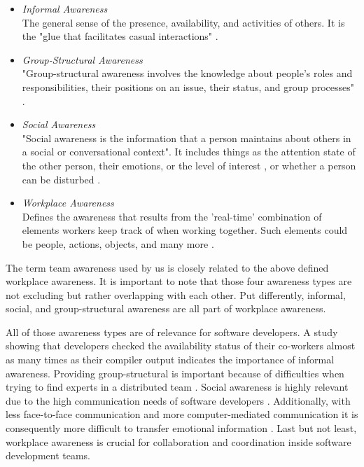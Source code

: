 \begin{itemize}
    \item \textit{Informal Awareness} \\
    The general sense of the presence, availability, and activities of others. It is the "glue that facilitates casual interactions" \cite{gutwin1996workspace}. 
    \item \textit{Group-Structural Awareness} \\
    "Group-structural awareness involves the knowledge about people’s
    roles and responsibilities, their positions on an issue, their status, and group processes" \cite{gutwin1996workspace}.
    \item \textit{Social Awareness} \\
    "Social awareness is the information that a person maintains about others in a social or conversational context"\cite{gutwin1996workspace}. It includes things as the attention state of the other person, their emotions, or the level of interest \cite{gutwin1996workspace}, or whether a person can be disturbed \cite{gutwin1995support}.
    \item \textit{Workplace Awareness} \\
    Defines the awareness that results from the 'real-time' combination of elements workers keep track of when working together. Such elements could be people, actions, objects, and many more \cite{gutwin1995support}. 
\end{itemize}

The term team awareness used by us is closely related to the above defined workplace awareness. It is important to note that those four awareness types are not excluding but rather overlapping with each other. Put differently, informal, social, and group-structural awareness are all part of workplace awareness. 

All of those awareness types are of relevance for software developers. A study showing that developers checked the availability status of their co-workers almost as many times as their compiler output \cite{ko2007information} indicates the importance of informal awareness. Providing group-structural is important because of difficulties when trying to find experts in a distributed team \cite{herbsleb2003empirical}. Social awareness is highly relevant due to the high communication needs of software developers \cite{perry1994people}. Additionally, with less face-to-face communication and more computer-mediated communication it is consequently more difficult to transfer emotional information \cite{rivera1996effects}. Last but not least, workplace awareness is crucial for collaboration and coordination inside software development teams.

